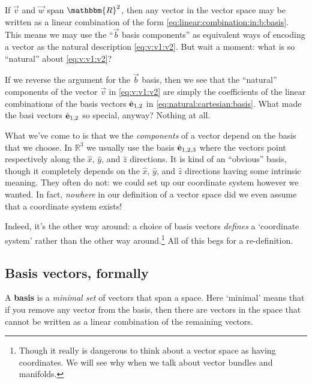 \documentclass[12pt]{article}
\begin{document}
If $\vec{v}$ and $\vec{w}$ span $\mathbbm{R}^2$, then any vector in the vector space may be written as a linear combination of the form \eqref{eq:linear:combination:in:b:basis}. This means we may use the ``$\vec{b}$ basis components'' as equivalent ways of encoding a vector as the natural description \eqref{eq:v:v1:v2}. But wait a moment: what is so ``natural'' about \eqref{eq:v:v1:v2}? 

If we reverse the argument for the $\vec{b}$ basis, then we see that the ``natural'' components of the vector $\vec{v}$ in \eqref{eq:v:v1:v2} are simply the coefficients of the linear combinations of the basis vectors ${\hat{\mathbf{e}}}_{1,2}$ in \eqref{eq:natural:cartesian:basis}. What made the basi vectors ${\hat{\mathbf{e}}}_{1,2}$ so special, anyway? Nothing at all. 

What we've come to is that we the \emph{components} of a vector depend on the basis that we choose. In $\mathbb{R}^3$ we usually use the basis ${\hat{\mathbf{e}}}_{1,2,3}$ where the vectors point respectively along the $\hat{x}$, $\hat{y}$, and $\hat{z}$ directions. It is kind of an ``obvious'' basis, though it completely depends on the $\hat{x}$, $\hat{y}$, and $\hat{z}$ directions having some intrinsic meaning. They often do not: we could set up our coordinate system however we wanted. In fact, \emph{nowhere} in our definition of a vector space did we even assume that a coordinate system exists!

Indeed, it's the other way around: a choice of basis vectors \emph{defines} a `coordinate system' rather than the other way around.\footnote{Though it really is dangerous to think about a vector space as having coordinates. We will see why when we talk about vector bundles and manifolds.} All of this begs for a re-definition.


\subsection{Basis vectors, formally}

A \textbf{basis} is a \emph{minimal set} of vectors that span a space. Here `minimal' means that if you remove any vector from the basis, then there are vectors in the space that cannot be written as a linear combination of the remaining vectors.
\end{document}
